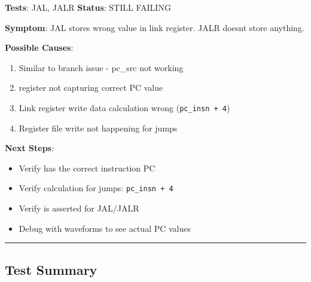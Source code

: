 \begin{record}

\textbf{Tests}: JAL, JALR \textbf{Status}: \bad{} STILL FAILING

\textbf{Symptom}: JAL stores wrong value in link register. JALR
doesn\textquotesingle t store anything.

\textbf{Possible Causes}:

\begin{enumerate}
\def\labelenumi{\arabic{enumi}.}
\tightlist
\item
  Similar to branch issue - pc\_src not working
\item
   register not capturing correct PC value
\item
  Link register write data calculation wrong
  (\texttt{pc\_\allowbreak{}insn\ +\allowbreak{}\ 4})
\item
  Register file write not happening for jumps
\end{enumerate}

\textbf{Next Steps}:

\begin{itemize}
\tightlist
\item
  Verify  has the correct instruction PC
\item
  Verify  calculation for jumps:
  \texttt{pc\_\allowbreak{}insn\ +\allowbreak{}\ 4}
\item
  Verify  is asserted for JAL/JALR
\item
  Debug with waveforms to see actual PC values
\end{itemize}

\begin{center}\rule{0.5\linewidth}{0.5pt}\end{center}

\end{record}

\subsection{\texorpdfstring{\notemark{} Test Summary}{ Test Summary}}\label{cr:fix:rtl-bug-fixes:bar-chart-test-summary}

